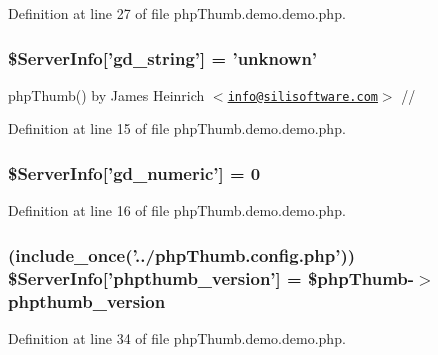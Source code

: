 \-Definition at line 27 of file php\-Thumb.\-demo.\-demo.\-php.

\hypertarget{php_thumb_8demo_8demo_8php_a486352e90512c78225b57b5f46c70bec}{
\subsubsection[{\$\-Server\-Info}]{\setlength{\rightskip}{0pt plus 5cm}\$\-Server\-Info\mbox{[}'gd\-\_\-string'\mbox{]} = 'unknown'}}\label{php_thumb_8demo_8demo_8php_a486352e90512c78225b57b5f46c70bec}
php\-Thumb() by \-James \-Heinrich $<$\href{mailto:info@silisoftware.com}{\tt info@silisoftware.\-com}$>$ // 

\-Definition at line 15 of file php\-Thumb.\-demo.\-demo.\-php.

\hypertarget{php_thumb_8demo_8demo_8php_ab117303405551f61aec5f0c7e18bd881}{
\subsubsection[{\$\-Server\-Info}]{\setlength{\rightskip}{0pt plus 5cm}\$\-Server\-Info\mbox{[}'gd\-\_\-numeric'\mbox{]} = 0}}\label{php_thumb_8demo_8demo_8php_ab117303405551f61aec5f0c7e18bd881}


\-Definition at line 16 of file php\-Thumb.\-demo.\-demo.\-php.

\hypertarget{php_thumb_8demo_8demo_8php_a58d35c9aba80b454eff286f005144fa3}{
\subsubsection[{\$\-Server\-Info}]{ (include\-\_\-once('../php\-Thumb.\-config.\-php')) \$\-Server\-Info\mbox{[}'phpthumb\-\_\-version'\mbox{]} = \$php\-Thumb-\/$>$phpthumb\-\_\-version}}\label{php_thumb_8demo_8demo_8php_a58d35c9aba80b454eff286f005144fa3}


\-Definition at line 34 of file php\-Thumb.\-demo.\-demo.\-php.

